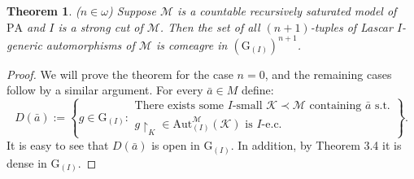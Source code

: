 \documentclass[11pt]{article}
\newtheorem{theorem}{Theorem}[section]
\theoremstyle{plain}
\theoremstyle{definition}
\newcommand{\M}{\mathcal{M}}
\newcommand{\K}{\mathcal{K}}
\newcommand{\G}{\mathrm{G}}
\newcommand{\A}{\mathrm{Aut}}
\newcommand{\Aa}{\A_{(I)}^{\M}(\K)}
\newcommand{\pa}{\mathrm{PA}}
\begin{document}
\begin{theorem}
($n\in\omega$) 	Suppose $ \M $ is a countable  recursively saturated model of $ \pa $ and $I$ is a strong cut of $\M$. Then the set of all $(n+1)$-tuples  of Lascar $I$-generic  automorphisms of  $ \M $  is comeagre in $ (\G_{(I)} )^{n+1}$.
\end{theorem}
\begin{proof}
	We will prove the theorem for the case $n=0$, and the remaining cases follow by a similar argument. For every $\bar{a}\in M$ define:
$$ D(\bar{a}):=\left\lbrace g\in\G_{(I)}: \begin{array}{c}
 \text{There exists some } I\text{-small }  \K\prec\M \text{ containing  } \bar{a} \text{ s.t.} \\ g\upharpoonright_{K}\in\Aa \text{ is } I\text{-e.c.}\end{array}\right\rbrace. $$
It is easy to see that $D(\bar{a})$ is open in $\G_{(I)}$. In addition,  by Theorem 3.4 it is  dense in $\G_{(I)}$.


\end{proof}
\end{document}
